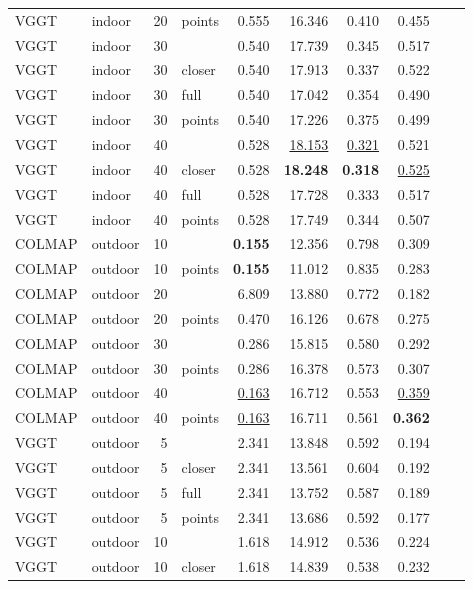 \begin{table}[H]
\begin{tabular}{llrlrrrrrr}
VGGT & indoor & 20 & points & 0.555 & 16.346 & 0.410 & 0.455 &  &  \\
VGGT & indoor & 30 &  & 0.540 & 17.739 & 0.345 & 0.517 &  &  \\
VGGT & indoor & 30 & closer & 0.540 & 17.913 & 0.337 & 0.522 &  &  \\
VGGT & indoor & 30 & full & 0.540 & 17.042 & 0.354 & 0.490 &  &  \\
VGGT & indoor & 30 & points & 0.540 & 17.226 & 0.375 & 0.499 &  &  \\
VGGT & indoor & 40 &  & 0.528 & \underline{18.153} & \underline{0.321} & 0.521 &  &  \\
VGGT & indoor & 40 & closer & 0.528 & \textbf{18.248} & \textbf{0.318} & \underline{0.525} &  &  \\
VGGT & indoor & 40 & full & 0.528 & 17.728 & 0.333 & 0.517 &  &  \\
VGGT & indoor & 40 & points & 0.528 & 17.749 & 0.344 & 0.507 &  &  \\
\midrule
COLMAP & outdoor & 10 &  & \textbf{0.155} & 12.356 & 0.798 & 0.309 &  &  \\
COLMAP & outdoor & 10 & points & \textbf{0.155} & 11.012 & 0.835 & 0.283 &  &  \\
COLMAP & outdoor & 20 &  & 6.809 & 13.880 & 0.772 & 0.182 &  &  \\
COLMAP & outdoor & 20 & points & 0.470 & 16.126 & 0.678 & 0.275 &  &  \\
COLMAP & outdoor & 30 &  & 0.286 & 15.815 & 0.580 & 0.292 &  &  \\
COLMAP & outdoor & 30 & points & 0.286 & 16.378 & 0.573 & 0.307 &  &  \\
COLMAP & outdoor & 40 &  & \underline{0.163} & 16.712 & 0.553 & \underline{0.359} &  &  \\
COLMAP & outdoor & 40 & points & \underline{0.163} & 16.711 & 0.561 & \textbf{0.362} &  &  \\
VGGT & outdoor & 5 &  & 2.341 & 13.848 & 0.592 & 0.194 &  &  \\
VGGT & outdoor & 5 & closer & 2.341 & 13.561 & 0.604 & 0.192 &  &  \\
VGGT & outdoor & 5 & full & 2.341 & 13.752 & 0.587 & 0.189 &  &  \\
VGGT & outdoor & 5 & points & 2.341 & 13.686 & 0.592 & 0.177 &  &  \\
VGGT & outdoor & 10 &  & 1.618 & 14.912 & 0.536 & 0.224 &  &  \\
VGGT & outdoor & 10 & closer & 1.618 & 14.839 & 0.538 & 0.232 &  &  \\

\end{tabular}
\end{table}
